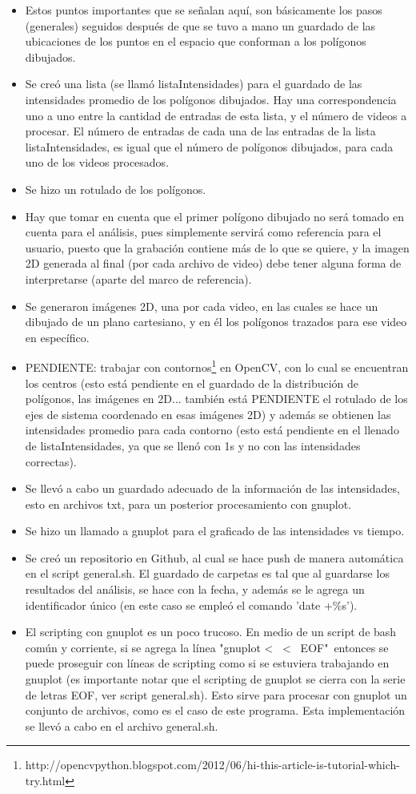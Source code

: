 \documentclass[letter]{article}
\begin{document}
\begin{itemize}
\item Estos puntos importantes que se señalan aquí, son básicamente los pasos (generales) seguidos después de que se tuvo a mano un guardado de las ubicaciones de los puntos en el espacio que conforman a los polígonos dibujados.
\item Se creó una lista (se llamó listaIntensidades) para el guardado de las intensidades promedio de los polígonos dibujados. Hay una correspondencia uno a uno entre la cantidad de entradas de esta lista, y el número de videos a procesar. El número de entradas de cada una de las entradas de la lista listaIntensidades, es igual que el número de polígonos dibujados, para cada uno de los videos procesados.
\item Se hizo un rotulado de los polígonos.
\item Hay que tomar en cuenta que el primer polígono dibujado no será tomado en cuenta para el análisis, pues simplemente servirá como referencia para el usuario, puesto que la grabación contiene más de lo que se quiere, y la imagen 2D generada al final (por cada archivo de video) debe tener alguna forma de interpretarse (aparte del marco de referencia).
\item Se generaron imágenes 2D, una por cada video, en las cuales se hace un dibujado de un plano cartesiano, y en él los polígonos trazados para ese video en específico.
\item PENDIENTE: trabajar con contornos\footnote{http://opencvpython.blogspot.com/2012/06/hi-this-article-is-tutorial-which-try.html} en OpenCV, con lo cual se encuentran los centros (esto está pendiente en el guardado de la distribución de polígonos, las imágenes en 2D... también está PENDIENTE el rotulado de los ejes de sistema coordenado en esas imágenes 2D) y además se obtienen las intensidades promedio para cada contorno (esto está pendiente en el llenado de listaIntensidades, ya que se llenó con 1s y no con las intensidades correctas).
\item Se llevó a cabo un guardado adecuado de la información de las intensidades, esto en archivos txt, para un posterior procesamiento con gnuplot.
\item Se hizo un llamado a gnuplot para el graficado de las intensidades vs tiempo.
\item Se creó un repositorio en Github, al cual se hace push de manera automática en el script general.sh. El guardado de carpetas es tal que al guardarse los resultados del análisis, se hace con la fecha, y además se le agrega un identificador único (en este caso se empleó el comando 'date +\%s').
\item El scripting con gnuplot es un poco trucoso. En medio de un script de bash común y corriente, si se agrega la línea "gnuplot < \ < \ EOF"\, entonces se puede proseguir con líneas de scripting como si se estuviera trabajando en gnuplot (es importante notar que el scripting de gnuplot se cierra con la serie de letras EOF, ver script general.sh). Esto sirve para procesar con gnuplot un conjunto de archivos, como es el caso de este programa. Esta implementación se llevó a cabo en el archivo general.sh.
\end{itemize}
\end{document}
